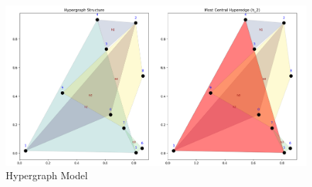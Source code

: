 \documentclass[10pt, a4paper]{article}
\begin{document}
\begin{figure}[h]
    \centering
    \includegraphics[width=1\linewidth]{hypergraph.png}
    \caption{Hypergraph Model}
    \label{fig:hypergraph}
\end{figure}
\end{document}
